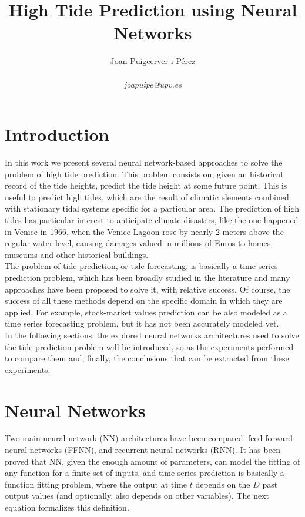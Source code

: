 \documentclass[10pt,a4paper]{article}
\author{Joan Puigcerver i Pérez\\
\begin{footnotesize}
\emph{joapuipe@upv.es}
\end{footnotesize}
}
\title{High Tide Prediction using Neural Networks}
\begin{document}
\maketitle
\section{Introduction}
In this work we present several neural network-based approaches to solve the problem of high tide prediction. This problem consists on, given an historical record of the tide heights, predict the tide height at some future point. This is useful to predict high tides, which are the result of climatic elements combined with stationary tidal systems specific for a particular area. The prediction of high tides has particular interest to anticipate climate disasters, like the one happened in Venice in 1966, when the Venice Lagoon rose by nearly 2 meters above the regular water level, causing damages valued in millions of Euros to homes, museums and other historical buildings.\\

The problem of tide prediction, or tide forecasting, is basically a time series prediction problem, which has been broadly studied in the literature and many approaches have been proposed to solve it, with relative success. Of course, the success of all these methods depend on the specific domain in which they are applied. For example, stock-market values prediction can be also modeled as a time series forecasting problem, but it has not been accurately modeled yet.\\

In the following sections, the explored neural networks architectures used to solve the tide prediction problem will be introduced, so as the experiments performed to compare them and, finally, the conclusions that can be extracted from these experiments.

\section{Neural Networks}
Two main neural network (NN) architectures have been compared: feed-forward neural networks (FFNN), and recurrent neural networks (RNN). It has been proved that NN, given the enough amount of parameters, can model the fitting of any function for a finite set of inputs, and time series prediction is basically a function fitting problem, where the output at time $t$ depends on the $D$ past output values (and optionally, also depends on other variables). The next equation formalizes this definition.
\end{document}
